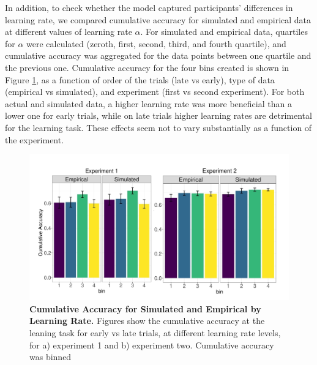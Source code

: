 \documentclass[a4paper,12pt]{article}
\begin{document}
In addition, to check whether the model captured participants' differences in learning rate, we compared cumulative accuracy for simulated and empirical data at different values of learning rate $\alpha$. For simulated and empirical data, quartiles for $\alpha$ were calculated (zeroth, first, second, third, and fourth quartile), and cumulative accuracy was aggregated for the data points between one quartile and the previous one. Cumulative accuracy for the four bins created is shown in Figure \ref{fig:binAll}, as a function of order of the trials (late vs early), type of data (empirical vs simulated), and experiment (first vs second experiment). For both actual and simulated data, a higher learning rate was more beneficial than a lower one for early trials, while on late trials higher learning rates are detrimental for the learning task. These effects seem not to vary substantially as a function of the experiment. 

\begin{figure}[ht!]
\centerline
{\includegraphics[width=1.5\textwidth]{figures/bin.plot.all.jpg}}
\caption{\textbf{Cumulative Accuracy for Simulated and Empirical by Learning Rate.} Figures show the cumulative accuracy at the leaning task for early vs late trials, at different learning rate levels, for a) experiment 1 and b) experiment two. Cumulative accuracy was binned  }
\label{fig:binAll}
\end{figure}
\end{document}
